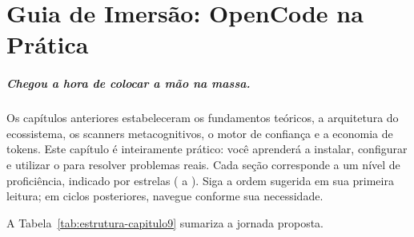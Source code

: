 \chapter{Guia de Imersão: OpenCode na Prática}
\label{ch:guia-imersao}

\paragraph{Chegou a hora de colocar a mão na massa.} Os capítulos anteriores
estabeleceram os fundamentos teóricos, a arquitetura do ecossistema, os
scanners metacognitivos, o motor de confiança e a economia de tokens. Este
capítulo é inteiramente prático: você aprenderá a instalar, configurar e
utilizar o \opencodeeco{} para resolver problemas reais. Cada seção
corresponde a um nível de proficiência, indicado por estrelas
(\nivelzero{} a \nivelavancado). Siga a ordem sugerida em sua primeira
leitura; em ciclos posteriores, navegue conforme sua necessidade.

A Tabela~\ref{tab:estrutura-capitulo9} sumariza a jornada proposta.

\begin{table}[htb]
\centering
    \small
\caption{Estrutura do Capítulo 9}
\label{tab:estrutura-capitulo9}
\end{table}

